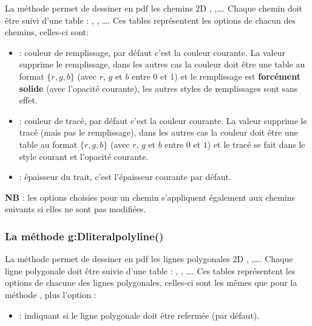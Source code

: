 La méthode  permet de dessiner en pdf les chemins 2D , ,\ldots. Chaque chemin doit être suivi d'une table : , , \ldots. Ces tables représentent les options de chacun des chemins, celles-ci sont:
    \begin{itemize}
        \item {} : couleur de remplissage, par défaut c'est la couleur courante. La valeur  supprime le remplissage, dans les autres cas la couleur doit être une table au format $\{r,g,b\}$ (avec $r$, $g$ et $b$ entre $0$ et $1$) et le remplissage est \textbf{forcément solide} (avec l'opacité courante), les autres styles de remplissages sont sans effet.
        
        \item {} : couleur de tracé, par défaut c'est la couleur courante. La valeur  supprime le tracé (mais pas le remplissage), dans les autres cas la couleur doit être une table au format $\{r,g,b\}$ (avec $r$, $g$ et $b$ entre $0$ et $1$) et le tracé se fait dans le style courant et l'opacité courante.
        
        \item {} : épaisseur du trait, c'est l'épaisseur courante par défaut.
    \end{itemize}

\textbf{NB} : les options choisies pour un chemin s'appliquent également aux chemins suivants si elles ne sont pas modifiées.

\subsubsection{La méthode g:Dliteralpolyline()}

La méthode  permet de dessiner en pdf les lignes polygonales 2D , ,\ldots. Chaque ligne polygonale doit être suivie d'une table : , , \ldots. Ces tables représentent les options de chacune des lignes polygonales, celles-ci sont les mêmes que pour la méthode , plus l'option :
    \begin{itemize}
        \item {} : indiquant si le ligne polygonale doit être refermée (\false par défaut).
    \end{itemize}

